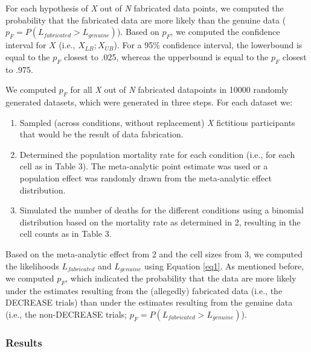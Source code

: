 \documentclass[]{article}
\begin{document}
For each hypothesis of \emph{X} out of \emph{N} fabricated data points,
we computed the probability that the fabricated data are more likely
than the genuine data (\(p_F=P(L_{fabricated}>L_{genuine})\)). Based on
\(p_F\), we computed the confidence interval for \(X\) (i.e.,
\(X_{LB};X_{UB}\)). For a 95\% confidence interval, the lowerbound is
equal to the \(p_F\) closest to .025, whereas the upperbound is equal to
the \(p_F\) closest to .975.

We computed \(p_F\) for all \emph{X} out of \emph{N} fabricated
datapoints in 10000 randomly generated datasets, which were generated in
three steps. For each dataset we:

\begin{enumerate}
\def\labelenumi{\arabic{enumi}.}
\item
  Sampled (across conditions, without replacement) \emph{X} fictitious
  participants that would be the result of data fabrication.
\item
  Determined the population mortality rate for each condition (i.e., for
  each cell as in Table 3). The meta-analytic point estimate was used or
  a population effect was randomly drawn from the meta-analytic effect
  distribution.
\item
  Simulated the number of deaths for the different conditions using a
  binomial distribution based on the mortality rate as determined in 2,
  resulting in the cell counts as in Table 3.
\end{enumerate}

Based on the meta-analytic effect from 2 and the cell sizes from 3, we
computed the likelihoods \(L_{fabricated}\) and \(L_{genuine}\) using
Equation \ref{eq1}. As mentioned before, we computed \(p_F\), which
indicated the probability that the data are more likely under the
estimates resulting from the (allegedly) fabricated data (i.e., the
DECREASE trials) than under the estimates resulting from the genuine
data (i.e., the non-DECREASE trials;
\(p_F=P(L_{fabricated}>L_{genuine})\)).

\subsubsection{Results}\label{results-2}
\end{document}
